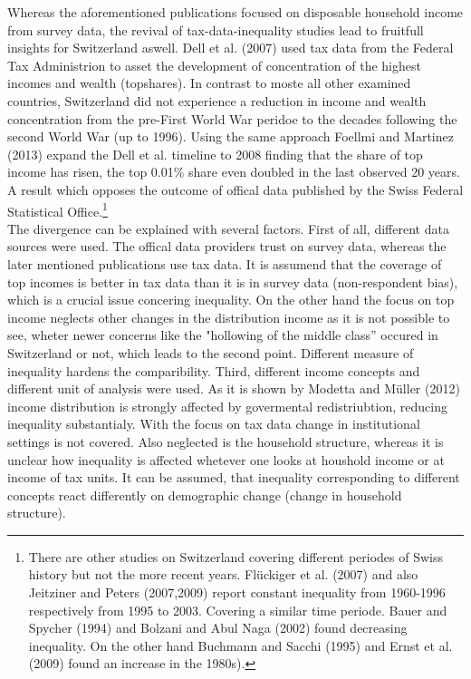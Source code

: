 \documentclass[twoside]{article}\usepackage[]{graphicx}\usepackage[]{color}
\begin{document}
\begin{multicols}{2}
Whereas the aforementioned publications focused on disposable household income from survey data, the revival of tax-data-inequality studies lead to fruitfull insights for Switzerland aswell. Dell et al. (2007) used tax data from the Federal Tax Administrion to asset the development of concentration of the highest incomes and wealth (topshares). In contrast to moste all other examined countries, Switzerland did not experience a reduction in income and wealth concentration from the pre-First World War peridoe to the decades following the second World War (up to 1996). Using the same approach Foellmi and Martinez (2013) expand the Dell et al. timeline to 2008 finding that the share of top income has risen, the top 0.01\% share even doubled in the last observed 20 years. A result which opposes the outcome of offical data published by the Swiss Federal Statistical Office.\footnote{There are other studies on Switzerland covering different periodes of Swiss history but not the more recent years. Flückiger et al. (2007) and also Jeitziner and Peters (2007,2009) report constant inequality from 1960-1996 respectively from 1995 to 2003. Covering a similar time periode. Bauer and Spycher (1994) and Bolzani and Abul Naga (2002) found decreasing inequality. On the other hand Buchmann and Sacchi (1995) and Ernst et al. (2009) found an increase in the 1980s).} \\

The divergence can be explained with several factors. First of all, different data sources were used. The offical data providers trust on survey data, whereas the later mentioned publications use tax data. It is assumend that the coverage of top incomes is better in tax data than it is in survey data (non-respondent bias), which is a crucial issue concering inequality. On the other hand the focus on top income neglects other changes in the distribution income as it is not possible to see, wheter newer concerns like the "hollowing of the middle class'' occured in Switzerland or not, which leads to the second point. Different measure of inequality hardens the comparibility. Third, different income concepts and different unit of analysis were used. As it is shown by Modetta and Müller (2012) income distribution is strongly affected by govermental redistriubtion, reducing inequality substantialy. With the focus on tax data change in institutional settings is not covered. Also neglected is the household structure, whereas it is unclear how inequality is affected whetever one looks at houshold income or at income of tax units. It can be assumed, that inequality corresponding to different concepts react differently on demographic change (change in household structure). \\


\end{multicols}
\end{document}
